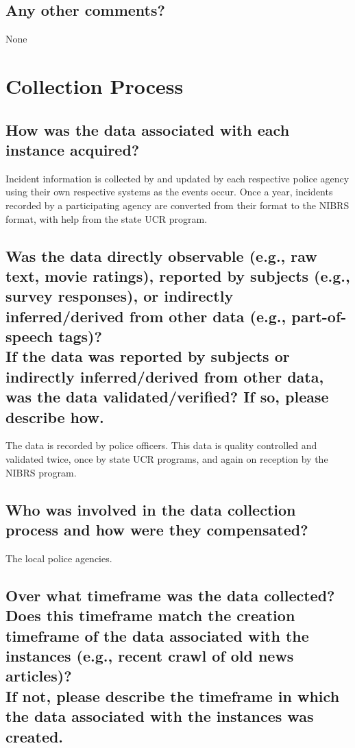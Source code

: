 \documentclass[letterpaper, 10 pt, conference]{ieeeconf}  %
\newcommand{\subtitle}[1]{{\\ \small \normalfont \color{purple} #1}}
\begin{document}
\subsection{Any other comments?}

None

\section{Collection Process}

\subsection{How was the data associated with each instance acquired?}

Incident information is collected by and updated by each respective police agency using their own respective systems as the events occur. Once a year, incidents recorded by a participating agency are converted from their format to the NIBRS format, with help from the state UCR program.

\subsection{Was the data directly observable (e.g., raw text, movie ratings), reported by subjects (e.g., survey responses), or indirectly inferred/derived from other data (e.g., part-of-speech tags)? \subtitle{If the data was reported by subjects or indirectly inferred/derived from other data, was the data validated/verified? If so, please describe how.}}

The data is recorded by police officers. This data is quality controlled and validated twice, once by state UCR programs, and again on reception by the NIBRS program. 

\subsection{Who was involved in the data collection process and how were they compensated?}

The local police agencies.

\subsection{Over what timeframe was the data collected? Does this timeframe match the creation timeframe of the data associated with the instances (e.g., recent crawl of old news articles)? \subtitle{If not, please describe the timeframe in which the data associated with the instances was created.}}
\end{document}
